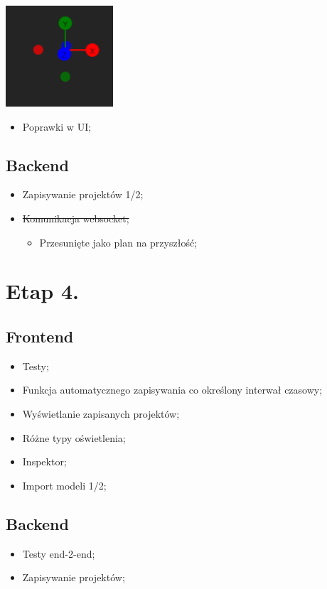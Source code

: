 \documentclass[11pt]{article}
\begin{document}
\begin{center}
\includegraphics[width=.9\linewidth]{./img/gizmo.jpg}
\end{center}
\begin{itemize}
\item Poprawki w UI;
\end{itemize}
\subsection{Backend}
\label{sec:orgc692a91}
\begin{itemize}
\item Zapisywanie projektów 1/2;
\item \sout{Komunikacja websocket;}
\begin{itemize}
\item Przesunięte jako plan na przyszłość;
\end{itemize}
\end{itemize}
\section{Etap 4.}
\label{sec:org4458288}
\subsection{Frontend}
\label{sec:org2f5443c}
\begin{itemize}
\item Testy;
\item Funkcja automatycznego zapisywania co określony interwał czasowy;
\item Wyświetlanie zapisanych projektów;
\item Różne typy oświetlenia;
\item Inspektor;
\item Import modeli 1/2;
\end{itemize}
\subsection{Backend}
\label{sec:org91d7526}
\begin{itemize}
\item Testy end-2-end;
\item Zapisywanie projektów;
\end{itemize}
\end{document}
